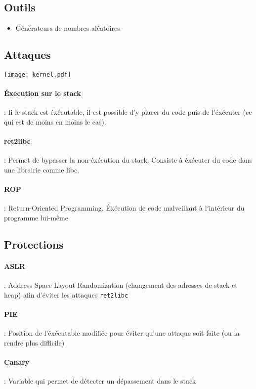 \subsection{Outils}
\begin{itemize}
\item Générateurs de nombres aléatoires
\end{itemize}
\subsection{Attaques}
\begin{center}
\texttt{[image: kernel.pdf]}
\end{center}
\paragraph{Éxecution sur le stack} : Ii le stack est éxécutable, il est possible d'y placer du code puis de l'éxécuter (ce qui est de moins en moins le cas).
\paragraph{ret2libc} : Permet de bypasser la non-éxécution du stack. Consiste à éxécuter du code dans une librairie comme libc.
\paragraph{ROP} : Return-Oriented Programming. Éxécution de code malveillant à l'intérieur du programme lui-même
\subsection{Protections}
\label{sec_protections}
\paragraph{ASLR} : Address Space Layout Randomization (changement des adresses de stack et heap) afin d'éviter les attaques \verb!ret2libc!
\paragraph{PIE} : Position de l'éxécutable modifiée pour éviter qu'une attaque soit faite (ou la rendre plus difficile)
\paragraph{Canary} : Variable qui permet de détecter un dépassement dans le stack